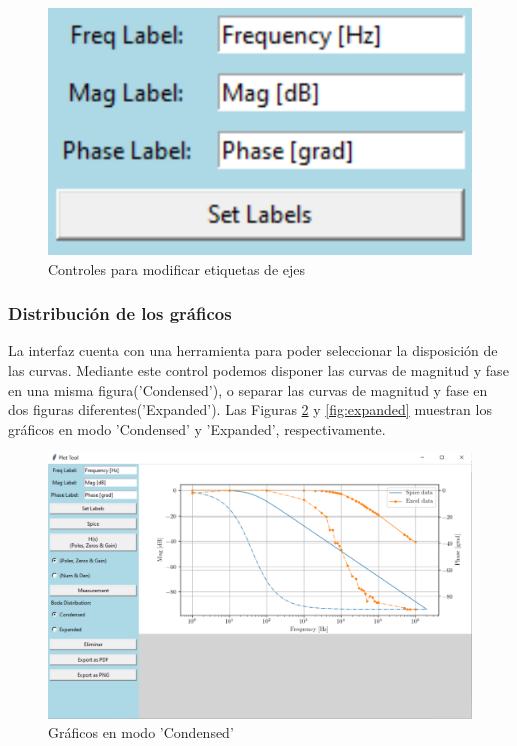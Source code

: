 \documentclass[10pt,a4paper]{article}
\begin{document}
\begin{figure}[ht]
\centering
\includegraphics[scale=0.3]{resources/labelsControl.png}
\caption{Controles para modificar etiquetas de ejes}
\label{fig:labesControl}
\end{figure}

\subsubsection{Distribución de los gráficos}
La interfaz cuenta con una herramienta para poder seleccionar la disposición de las curvas. Mediante este control podemos disponer las curvas de magnitud y fase en una misma figura('Condensed'), o separar las curvas de magnitud y fase en dos figuras diferentes('Expanded'). Las Figuras \ref{fig:condensed} y \ref{fig:expanded} muestran los gráficos en modo 'Condensed' y 'Expanded', respectivamente.

\begin{figure}[ht]
\centering
\includegraphics[scale=0.15]{resources/condensed.png}
\caption{Gráficos en modo 'Condensed'}
\label{fig:condensed}
\end{figure}
\end{document}
